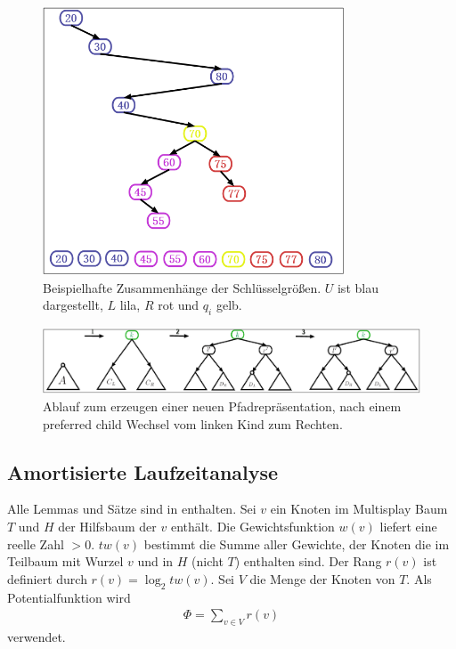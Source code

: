 \documentclass[a4paper,12pt]{article}
\begin{document}
\begin{figure}[h]
	\centering
	\includegraphics[width= 0.8\textwidth]{"Medien/Multisplay/keySpace"}
	\caption {Beispielhafte Zusammenhänge der Schlüsselgrößen. $U$ ist blau dargestellt, $L$ lila, $R$ rot und $q_i$ gelb. }
	\label{fig:keySpace}
\end{figure} 
\begin{figure}[h]
	\centering
	\includegraphics[width= 1\textwidth]{"Medien/Multisplay/split"}
	\caption {Ablauf zum erzeugen einer neuen Pfadrepräsentation, nach einem preferred child Wechsel vom linken Kind zum Rechten.}
	\label{fig:split}
\end{figure} 


\subsection{Amortisierte Laufzeitanalyse}
Alle Lemmas und Sätze sind in \cite{multisplay} enthalten.
Sei $v$ ein Knoten im Multisplay Baum $T$ und $H$ der Hilfsbaum der $v$ enthält. Die Gewichtsfunktion $w\left(v\right)$ liefert eine reelle Zahl $>0$.  $\mathit{tw}\left(v\right)$ bestimmt die Summe aller Gewichte, der Knoten die im Teilbaum mit Wurzel $v$ und in $H$ (nicht $T$) enthalten sind. Der Rang  $r\left(v\right)$ ist definiert durch $r\left(v\right) = \log_2  \mathit{tw}\left(v\right)$. Sei $V$ die Menge der Knoten von $T$. Als Potentialfunktion wird 
\begin{align*}
\Phi = \sum_{v \in V} r\left(v\right)
\end{align*}
verwendet.
\end{document}
